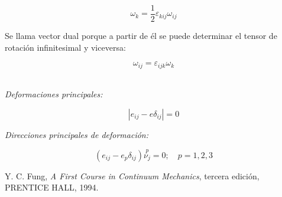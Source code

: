\documentclass[a4paper,10pt,twoside,final,spanish]{article}
\begin{document}
\begin{minipage}{0.3\linewidth}

\begin{equation}
\omega_{k}=\frac{1}{2}\varepsilon_{kij}\omega_{ij}
\end{equation}

\end{minipage} \hfill \begin{minipage}{0.3\linewidth}

Se llama vector dual porque a partir de él se puede determinar el tensor de rotación infinitesimal y viceversa:

\end{minipage} \hfill \begin{minipage}{0.3\linewidth}

\begin{equation}
\omega_{ij}=\varepsilon_{ijk}\omega_{k}
\end{equation}

\end{minipage}\\

\textit{Deformaciones principales:}

\begin{equation}
|e_{ij}-e\delta_{ij}|=0
\end{equation}

\textit{Direcciones principales de deformación:}

\begin{equation}
(e_{ij}-e_{p}\delta_{ij})\stackrel{p}{\nu_{j}}=0;\quad p=1,2,3
\end{equation}

\begin{thebibliography}{1}
Y. C. Fung,
\emph{A First Course in Continuum Mechanics}, 
tercera edición,
PRENTICE HALL,
1994.
\end{thebibliography}
\end{document}
